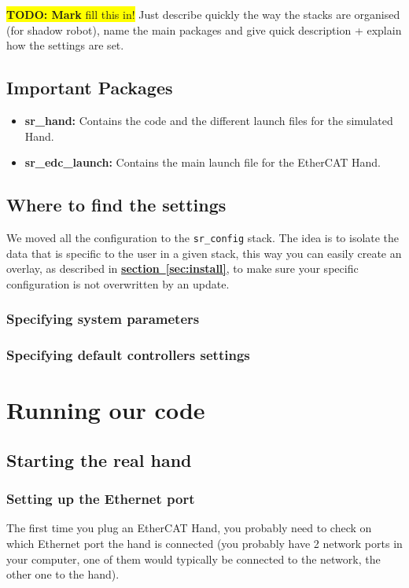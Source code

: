 \documentclass[12pt]{article}
\newcommand{\todo}[1]{\colorbox{yellow}{\textbf{TODO: #1} fill this in!}}
\newcommand{\link}[1]{\hyperref[sec:#1]{\textbf{section~\ref*{sec:#1}}}}
\begin{document}
\todo{Mark} Just describe quickly the way the stacks are organised (for shadow robot), name the main packages and give quick description + explain how the settings are set.

\subsection{Important Packages}
\label{sec:important-packages}
\begin{itemize}
\item \textbf{sr\_hand:} Contains the code and the different launch files for the simulated Hand.
\item \textbf{sr\_edc\_launch:} Contains the main launch file for the EtherCAT Hand.
\end{itemize}


\subsection{Where to find the settings}
\label{sec:where-find-settings}
\par We moved all the configuration to the \texttt{sr\_config} stack. The idea is to isolate the data that is specific to the user in a given stack, this way you can easily create an overlay, as described in \link{install}, to make sure your specific configuration is not overwritten by an update.

\subsubsection{Specifying system parameters}
\label{sec:spec-system-param}

\subsubsection{Specifying default controllers settings}
\label{sec:spec-defa-contr}

\newpage

\section{Running our code}
\label{sec:running-our-code}

\subsection{Starting the real hand}
\label{sec:starting-real-hand}

\subsubsection{Setting up the Ethernet port}
\par The first time you plug an EtherCAT Hand, you probably need to check on which Ethernet port the hand is connected (you probably have 2 network ports in your computer, one of them would typically be connected to the network, the other one to the hand).\\
\end{document}
